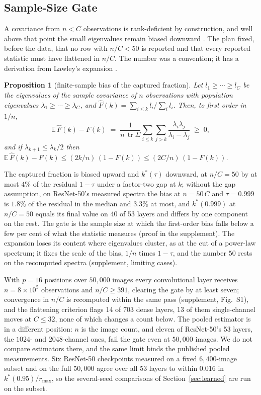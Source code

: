 \documentclass[10pt,journal,compsoc]{IEEEtran}
\newtheorem{proposition}{Proposition}
\begin{document}
\subsection{Sample-Size Gate}
\label{sec:samplesize}

A covariance from $n < C$ observations is rank-deficient by construction,
and well above that point the small eigenvalues remain biased downward
\cite{pospisil2025revisiting,chun2026estimating}. The plan fixed, before the
data, that no row with $n/C < 50$ is reported and that every reported
statistic must have flattened in $n/C$. The number was a convention; it has
a derivation from Lawley's expansion \cite{lawley1956latentRoots}.

\begin{proposition}[finite-sample bias of the captured fraction]
\label{prop:gate}
Let $l_1 \ge \cdots \ge l_C$ be the eigenvalues of the sample covariance of $n$ observations with population eigenvalues $\lambda_1 \ge \cdots \ge \lambda_C$, and $\hat F(k) = \sum_{i \le k} l_i / \sum_i l_i$. Then, to first order in $1/n$,
\[
  \mathbb{E}\,\hat F(k) - F(k) \;=\; \frac{1}{n\,\operatorname{tr}\Sigma} \sum_{i \le k} \sum_{j > k} \frac{\lambda_i \lambda_j}{\lambda_i - \lambda_j} \;\ge\; 0,
\]
and if $\lambda_{k+1} \le \lambda_k / 2$ then $\mathbb{E}\,\hat F(k) - F(k) \le (2k/n)\,(1 - F(k)) \le (2C/n)\,(1 - F(k))$.
\end{proposition}

The captured fraction is biased upward and $k^*(\tau)$ downward, at
$n/C = 50$ by at most $4\%$ of the residual $1 - \tau$ under a factor-two
gap at $k$; without the gap assumption, on ResNet-50's measured spectra
the bias at $n = 50\,C$ and $\tau = 0.999$ is $1.8\%$ of the residual in
the median and $3.3\%$ at most, and $k^*(0.999)$ at $n/C = 50$ equals its
final value on 40 of 53 layers and differs by one component on the rest.
The gate is the sample size at which the first-order bias falls below a
few per cent of what the statistic measures (proof in the supplement).
The expansion loses its content where eigenvalues cluster, as at the cut
of a power-law spectrum; it fixes the scale of the bias, $1/n$ times
$1 - \tau$, and the number $50$ rests on the recomputed spectra
(supplement, limiting cases).

With $p = 16$ positions over $50{,}000$ images every convolutional layer
receives $n = 8 \times 10^5$ observations and $n/C \ge 391$, clearing the
gate by at least seven; convergence in $n/C$ is recomputed within the same
pass (supplement, Fig.~S1), and the flattening criterion flags 14 of 703
dense layers, 13 of them single-channel moves at $C \le 32$, none of which
changes a count below. The pooled estimator is in a different position:
$n$ is the image count, and eleven of ResNet-50's 53 layers, the $1024$-
and $2048$-channel ones, fail the gate even at $50{,}000$ images. We do not
compare estimators there, and the same limit binds the published pooled
measurements. Six ResNet-50 checkpoints measured on a fixed
$6{,}400$-image subset and on the full $50{,}000$ agree over all 53 layers
to within $0.016$ in $k^*(0.95)/r_{\max}$, so the several-seed comparisons
of Section~\ref{sec:learned} are run on the subset.
\end{document}
